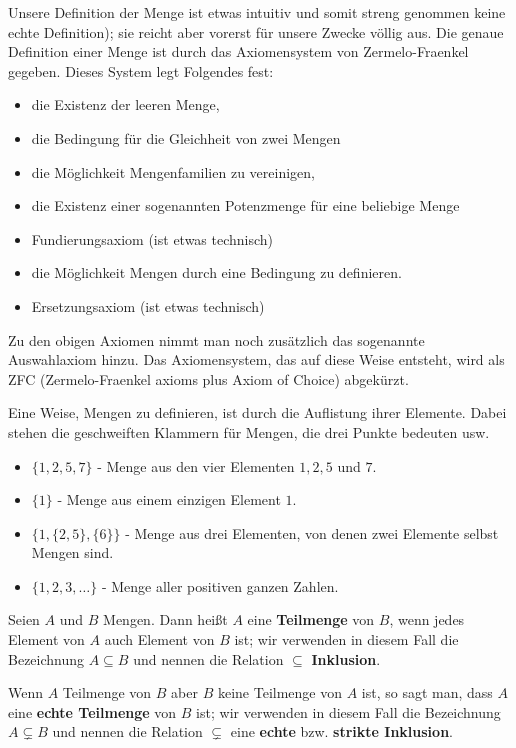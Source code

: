 \begin{bem}
	Unsere Definition der Menge ist etwas intuitiv und  somit streng genommen keine echte Definition); sie reicht aber vorerst für unsere Zwecke völlig aus. Die genaue Definition einer Menge ist durch das Axiomensystem von Zermelo-Fraenkel gegeben. Dieses System legt Folgendes fest: 
	\begin{itemize}
		\item die Existenz der leeren Menge, 
		\item die Bedingung für die Gleichheit von zwei Mengen
		\item die Möglichkeit Mengenfamilien zu vereinigen, 
		\item die Existenz einer sogenannten Potenzmenge für eine beliebige Menge
		\item Fundierungsaxiom (ist etwas technisch)
		\item die Möglichkeit Mengen durch eine Bedingung zu definieren. 
		\item Ersetzungsaxiom (ist etwas technisch)
	\end{itemize} 
	Zu den obigen Axiomen nimmt man noch zusätzlich das sogenannte Auswahlaxiom hinzu. Das Axiomensystem, das auf diese Weise entsteht, wird als ZFC (Zermelo-Fraenkel axioms plus Axiom of Choice) abgekürzt. 
\end{bem} 


\begin{bsp} 
Eine Weise, Mengen zu definieren, ist durch die Auflistung ihrer Elemente. Dabei stehen die geschweiften Klammern für Mengen, die drei Punkte bedeuten \glqq usw\grqq.
\begin{itemize}
	\item $ \{1,2,5,7\} $ - Menge aus den vier Elementen $1,2,5$ und $7$. 
	\item $ \{1\} $ - Menge aus einem einzigen Element $1$. 
	\item $ \{1,\{2,5\},\{6\}\} $ - Menge aus drei Elementen, von denen zwei Elemente selbst Mengen sind. 
	\item $ \{1,2,3,\ldots\} $ - Menge aller positiven ganzen Zahlen. 
\end{itemize}
\end{bsp}

\begin{defn}
Seien $ A $ und $ B $ Mengen. Dann heißt $ A $ eine \textbf{Teilmenge} von $ B $, wenn jedes Element von $ A $ auch Element von $ B $ ist;  wir verwenden in diesem Fall die Bezeichnung $A \subseteq B$ und nennen die Relation $\subseteq$ \textbf{Inklusion}. 

Wenn $A$ Teilmenge von $B$ aber $B$ keine Teilmenge von $A$ ist, so sagt man, dass $A$ eine \textbf{echte Teilmenge} von $B$ ist; wir verwenden in diesem Fall die Bezeichnung $A \varsubsetneq B$ und nennen die Relation $\varsubsetneq$ eine \textbf{echte} bzw. \textbf{strikte Inklusion}. 
\end{defn}


